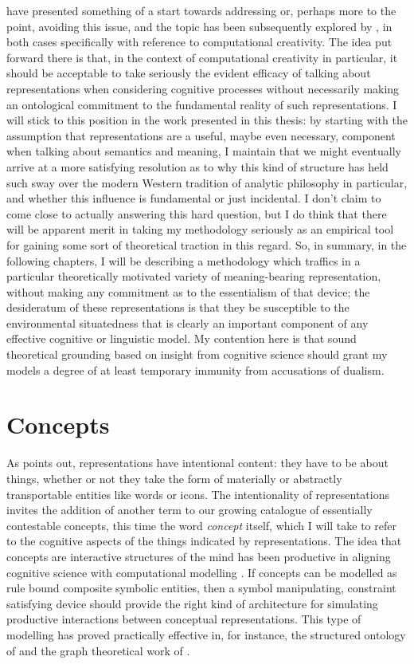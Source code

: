\cite{McGregorEA2014} have presented something of a start towards addressing or, perhaps more to the point, avoiding this issue, and the topic has been subsequently explored by \cite{Coeckelbergh2016}, in both cases specifically with reference to computational creativity.  The idea put forward there is that, in the context of computational creativity in particular, it should be acceptable to take seriously the evident efficacy of talking about representations when considering cognitive processes without necessarily making an ontological commitment to the fundamental reality of such representations.  I will stick to this position in the work presented in this thesis: by starting with the assumption that representations are a useful, maybe even necessary, component when talking about semantics and meaning, I maintain that we might eventually arrive at a more satisfying resolution as to why this kind of structure has held such sway over the modern Western tradition of analytic philosophy in particular, and whether this influence is fundamental or just incidental.  I don't claim to come close to actually answering this hard question, but I do think that there will be apparent merit in taking my methodology seriously as an empirical tool for gaining some sort of theoretical traction in this regard.  So, in summary, in the following chapters, I will be describing a methodology which traffics in a particular theoretically motivated variety of meaning-bearing representation, without making any commitment as to the essentialism of that device; the desideratum of these representations is that they be susceptible to the environmental situatedness that is clearly an important component of any effective cognitive or linguistic model.  My contention here is that sound theoretical grounding based on insight from cognitive science should grant my models a degree of at least temporary immunity from accusations of dualism.

\section{Concepts} \label{sec:concepts}
As \cite{Searle1983b} points out, representations have intentional content: they have to be about things, whether or not they take the form of materially or abstractly transportable entities like words or icons.  The intentionality of representations invites the addition of another term to our growing catalogue of essentially contestable concepts, this time the word \emph{concept} itself, which I will take to refer to the cognitive aspects of the things indicated by representations.  The idea that concepts are interactive structures of the mind \citep{MargolisEA2007,Fodor2008} has been productive in aligning cognitive science with computational modelling \citep{Boden2006}.  If concepts can be modelled as rule bound composite symbolic entities, then a symbol manipulating, constraint satisfying device should provide the right kind of architecture for simulating productive interactions between conceptual representations.  This type of modelling has proved practically effective in, for instance, the structured ontology of \cite{Lenat1995} and the graph theoretical work of \cite{Sowa2006}.

